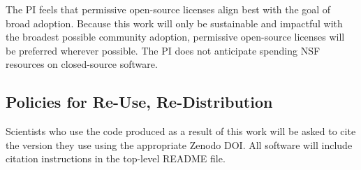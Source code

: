 \documentclass[11pt]{article}
\begin{document}
The PI feels that permissive open-source licenses align best with the goal of broad adoption.  Because this work will only be sustainable and impactful with the broadest possible community adoption, permissive open-source licenses will be preferred wherever possible.  The PI does not anticipate spending NSF resources on closed-source software.





\subsection{Policies for Re-Use, Re-Distribution}
Scientists who use the code produced as a result of this work will be asked to cite the version they use using the appropriate Zenodo DOI.  All software will include citation instructions in the top-level README file.
\end{document}
